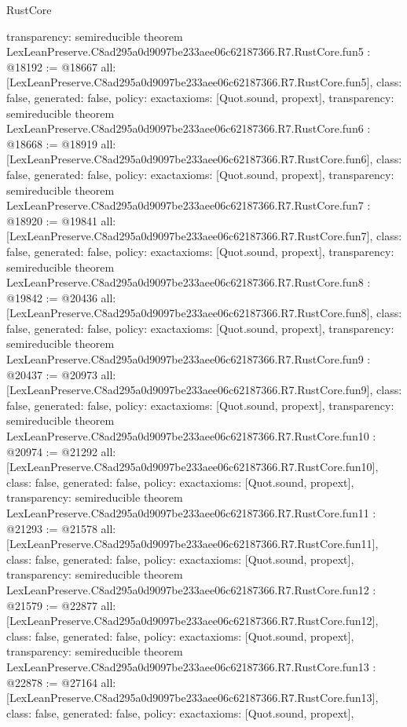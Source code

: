\begin{lexlean}{RustCore}
\begin{coremodule}
{  transparency: semireducible
}
theorem LexLeanPreserve.C8ad295a0d9097be233aee06c62187366.R7.RustCore.fun5 : @18192 := @18667 {
  all: [LexLeanPreserve.C8ad295a0d9097be233aee06c62187366.R7.RustCore.fun5],
  class: false,
  generated: false,
  policy: exact{axioms: [Quot.sound, propext]},
  transparency: semireducible
}
theorem LexLeanPreserve.C8ad295a0d9097be233aee06c62187366.R7.RustCore.fun6 : @18668 := @18919 {
  all: [LexLeanPreserve.C8ad295a0d9097be233aee06c62187366.R7.RustCore.fun6],
  class: false,
  generated: false,
  policy: exact{axioms: [Quot.sound, propext]},
  transparency: semireducible
}
theorem LexLeanPreserve.C8ad295a0d9097be233aee06c62187366.R7.RustCore.fun7 : @18920 := @19841 {
  all: [LexLeanPreserve.C8ad295a0d9097be233aee06c62187366.R7.RustCore.fun7],
  class: false,
  generated: false,
  policy: exact{axioms: [Quot.sound, propext]},
  transparency: semireducible
}
theorem LexLeanPreserve.C8ad295a0d9097be233aee06c62187366.R7.RustCore.fun8 : @19842 := @20436 {
  all: [LexLeanPreserve.C8ad295a0d9097be233aee06c62187366.R7.RustCore.fun8],
  class: false,
  generated: false,
  policy: exact{axioms: [Quot.sound, propext]},
  transparency: semireducible
}
theorem LexLeanPreserve.C8ad295a0d9097be233aee06c62187366.R7.RustCore.fun9 : @20437 := @20973 {
  all: [LexLeanPreserve.C8ad295a0d9097be233aee06c62187366.R7.RustCore.fun9],
  class: false,
  generated: false,
  policy: exact{axioms: [Quot.sound, propext]},
  transparency: semireducible
}
theorem LexLeanPreserve.C8ad295a0d9097be233aee06c62187366.R7.RustCore.fun10 : @20974 := @21292 {
  all: [LexLeanPreserve.C8ad295a0d9097be233aee06c62187366.R7.RustCore.fun10],
  class: false,
  generated: false,
  policy: exact{axioms: [Quot.sound, propext]},
  transparency: semireducible
}
theorem LexLeanPreserve.C8ad295a0d9097be233aee06c62187366.R7.RustCore.fun11 : @21293 := @21578 {
  all: [LexLeanPreserve.C8ad295a0d9097be233aee06c62187366.R7.RustCore.fun11],
  class: false,
  generated: false,
  policy: exact{axioms: [Quot.sound, propext]},
  transparency: semireducible
}
theorem LexLeanPreserve.C8ad295a0d9097be233aee06c62187366.R7.RustCore.fun12 : @21579 := @22877 {
  all: [LexLeanPreserve.C8ad295a0d9097be233aee06c62187366.R7.RustCore.fun12],
  class: false,
  generated: false,
  policy: exact{axioms: [Quot.sound, propext]},
  transparency: semireducible
}
theorem LexLeanPreserve.C8ad295a0d9097be233aee06c62187366.R7.RustCore.fun13 : @22878 := @27164 {
  all: [LexLeanPreserve.C8ad295a0d9097be233aee06c62187366.R7.RustCore.fun13],
  class: false,
  generated: false,
  policy: exact{axioms: [Quot.sound, propext]},
}
\end{coremodule}
\end{lexlean}
